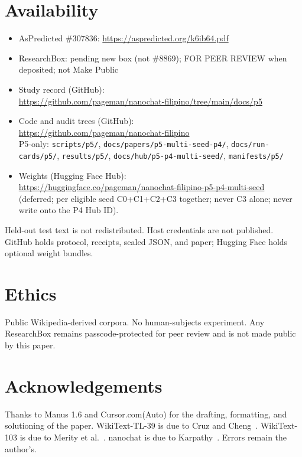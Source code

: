\documentclass[11pt,a4paper]{article}
\begin{document}
\section*{Availability}
\begin{itemize}[leftmargin=1.6em,itemsep=0.35em]
\item AsPredicted \#307836: \url{https://aspredicted.org/k6ib64.pdf}
\item ResearchBox: pending new box (not \#8869); FOR PEER REVIEW when deposited; not Make Public
\item Study record (GitHub):\\
\url{https://github.com/pageman/nanochat-filipino/tree/main/docs/p5}
\item Code and audit trees (GitHub):\\
\url{https://github.com/pageman/nanochat-filipino}\\
P5-only: \texttt{scripts/p5/}, \texttt{docs/papers/p5-multi-seed-p4/},
\texttt{docs/run-cards/p5/}, \texttt{results/p5/},
\texttt{docs/hub/p5-p4-multi-seed/}, \texttt{manifests/p5/}
\item Weights (Hugging Face Hub):\\
\url{https://huggingface.co/pageman/nanochat-filipino-p5-p4-multi-seed}\\
(deferred; per eligible seed C0+C1+C2+C3 together; never C3 alone; never write onto the P4 Hub ID).
\end{itemize}
Held-out test text is not redistributed. Host credentials are not published. GitHub holds protocol, receipts, sealed JSON, and paper; Hugging Face holds optional weight bundles.

\section*{Ethics}
Public Wikipedia-derived corpora. No human-subjects experiment. Any ResearchBox remains passcode-protected for peer review and is not made public by this paper.

\section*{Acknowledgements}
Thanks to Manus 1.6 and Cursor.com(Auto) for the drafting, formatting, and solutioning of the paper. WikiText-TL-39 is due to Cruz and Cheng~\cite{cruz2019eval}. WikiText-103 is due to Merity et al.~\cite{merity2017pointer}. nanochat is due to Karpathy~\cite{karpathy2026nanochat}. Errors remain the author's.
\end{document}
